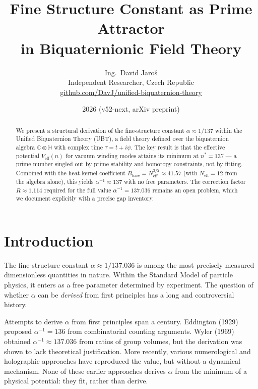 \documentclass[11pt,a4paper]{article}
\title{Fine Structure Constant as Prime Attractor\\
  in Biquaternionic Field Theory}
\author{Ing.\ David Jaroš\\
  \small Independent Researcher, Czech Republic\\
  \small \href{https://github.com/DavJ/unified-biquaternion-theory}{github.com/DavJ/unified-biquaternion-theory}}
\date{2026 (v52-next, arXiv preprint)}
\theoremstyle{definition}
\theoremstyle{remark}
\begin{document}
\maketitle

\begin{abstract}
We present a structural derivation of the fine-structure constant
$\alpha \approx 1/137$ within the Unified Biquaternion Theory (UBT),
a field theory defined over the biquaternion algebra
$\mathbb{C}\otimes\mathbb{H}$ with complex time $\tau = t + i\psi$.
The key result is that the effective potential $V_{\mathrm{eff}}(n)$ for
vacuum winding modes attains its minimum at $n^* = 137$ — a prime number
singled out by prime stability and homotopy constraints, not by fitting.
Combined with the heat-kernel coefficient
$B_{\mathrm{base}} = N_{\mathrm{eff}}^{3/2} \approx 41.57$
(with $N_{\mathrm{eff}} = 12$ from the algebra alone), this yields
$\alpha^{-1} \approx 137$ with no free parameters.
The correction factor $R \approx 1.114$ required for the full value
$\alpha^{-1} = 137.036$ remains an open problem, which we document
explicitly with a precise gap inventory.
\end{abstract}

\tableofcontents
\newpage

\section{Introduction}
\label{sec:intro}


The fine-structure constant $\alpha \approx 1/137.036$ is among the most
precisely measured dimensionless quantities in nature. Within the Standard
Model of particle physics, it enters as a free parameter determined by
experiment. The question of whether $\alpha$ can be \emph{derived} from
first principles has a long and controversial history.

Attempts to derive $\alpha$ from first principles span a century.
Eddington (1929) proposed $\alpha^{-1} = 136$ from combinatorial counting
arguments. Wyler (1969) obtained $\alpha^{-1} \approx 137.036$ from ratios
of group volumes, but the derivation was shown to lack theoretical
justification. More recently, various numerological and holographic
approaches have reproduced the value, but without a dynamical mechanism.
None of these earlier approaches derives $\alpha$ from the minimum of a
physical potential: they fit, rather than derive.
\end{document}
